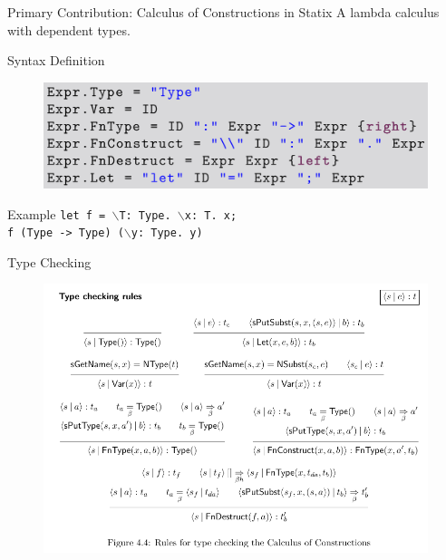 \documentclass[aspectratio=43]{beamer}
\begin{document}
\begin{frame}[fragile]{Primary Contribution: Calculus of Constructions in Statix}
	A lambda calculus with dependent types.
	
	\begin{block}{Syntax Definition}
		\begin{figure}
			\includegraphics[width=0.7\linewidth]{img/screenshot006}
		\end{figure}
	\end{block}

	\begin{exampleblock}{Example}
		\texttt{let f = $\backslash$T: Type. $\backslash$x: T. x; \\
f (Type -> Type) ($\backslash$y: Type. y)
		}
	\end{exampleblock}

\end{frame}

\begin{frame}[fragile]{Type Checking}
	\begin{figure}
		\includegraphics[width=0.9\linewidth]{img/screenshot007}
	\end{figure}
\end{frame}
\end{document}
